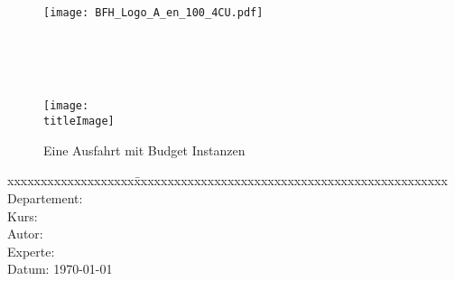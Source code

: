 \thispagestyle{empty}

\begin{figure}
	\texttt{[image: BFH\_Logo\_A\_en\_100\_4CU.pdf]}
\end{figure}


\begin{minipage}[c][3cm][c]{\linewidth} {
	\centering
	\vspace*{2cm}
	{\fontsize{24pt}{0pt}\selectfont \textbf{\doctitle}}  \\
	\vspace*{0.6cm}
	{\fontsize{20pt}{0pt}\selectfont {Geodeatenprozessierung\\ mit Budget Instanzen (SPOT)\\ auf Amazon EKS}}  \\
	\vspace*{1cm}
	{\fontsize{14pt}{0pt}\selectfont \doctype}  \\
}
\end{minipage}


\vspace{1.5cm}


\begin{figure}[H]
	\centering
	\makebox[0.8\linewidth]{\color{BFHGray} \rule{0.8\linewidth}{10pt}}
	\texttt{[image: \\titleImage]}
	\makebox[0.8\linewidth]{\color{BFHGray} \rule{0.8\linewidth}{10pt}}
    \caption{Eine Ausfahrt mit Budget Instanzen\space\cite{HippieCar:1}}
\end{figure}

\vfill

\begin{minipage}[c][3cm][c]{\linewidth}
{
	\centering
	\begin{tabbing}
		xxxxxxxxxxxxxxxxxxx\=xxxxxxxxxxxxxxxxxxxxxxxxxxxxxxxxxxxxxxxxxxxxxxx \kill
		Departement:	\> \fieldofstudies \\
		Kurs:			\> \course \\
		Autor:		\> \docauthor \\
		Experte:		\> \prof \\
		Datum:			\> \today \\
	\end{tabbing}
}
\end{minipage}

\pagebreak
